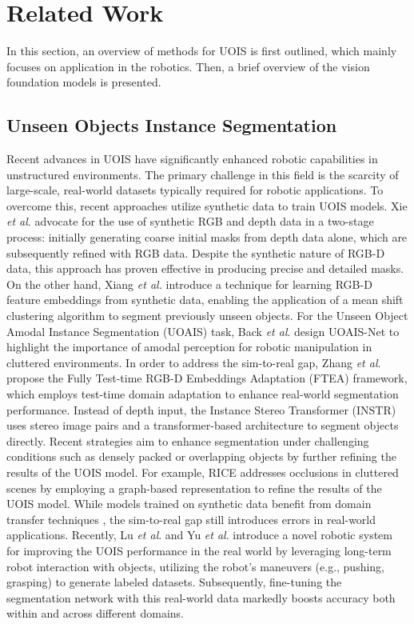 \section{Related Work}
\label{section2}
In this section, an overview of methods for UOIS is first outlined, which mainly focuses on application in the robotics. Then, a brief overview of the vision foundation models is presented. 
\subsection{Unseen Objects Instance Segmentation}
Recent advances in UOIS have significantly enhanced robotic capabilities in unstructured environments. The primary challenge in this field is the scarcity of large-scale, real-world datasets typically required for robotic applications. To overcome this, recent approaches utilize synthetic data to train UOIS models. Xie \emph{et al}. \cite{xie2020best, xie2021unseen} advocate for the use of synthetic RGB and depth data in a two-stage process: initially generating coarse initial masks from depth data alone, which are subsequently refined with RGB data. Despite the synthetic nature of RGB-D data, this approach has proven effective in producing precise and detailed masks. On the other hand, Xiang \emph{et al.} \cite{xiang2021learning} introduce a technique for learning RGB-D feature embeddings from synthetic data, enabling the application of a mean shift clustering algorithm to segment previously unseen objects. For the Unseen Object Amodal Instance Segmentation (UOAIS) task, Back \emph{et al}. \cite{back2022unseen} design UOAIS-Net to highlight the importance of amodal perception for robotic manipulation in cluttered environments. In order to address the sim-to-real gap, Zhang \emph{et al}. \cite{zhang2023unseen} propose the Fully Test-time RGB-D Embeddings Adaptation (FTEA) framework, which employs test-time domain adaptation to enhance real-world segmentation performance. Instead of depth input, the Instance Stereo Transformer (INSTR) \cite{9636281} uses stereo image pairs and a transformer-based architecture to segment objects directly. Recent strategies aim to enhance segmentation under challenging conditions such as densely packed or overlapping objects by further refining the results of the UOIS model. For example, RICE \cite{xie2022rice} addresses occlusions in cluttered scenes by employing a graph-based representation to refine the results of the UOIS model. While models trained on synthetic data benefit from domain transfer techniques \cite{zhang2023unseen}, the sim-to-real gap still introduces errors in real-world applications. Recently, Lu \emph{et al}. \cite{lu2023self} and Yu \emph{et al}. \cite{yu2022self} introduce a novel robotic system for improving the UOIS performance in the real world by leveraging long-term robot interaction with objects, utilizing the robot's maneuvers (e.g., pushing, grasping) to generate labeled datasets. Subsequently, fine-tuning the segmentation network with this real-world data markedly boosts accuracy both within and across different domains.

